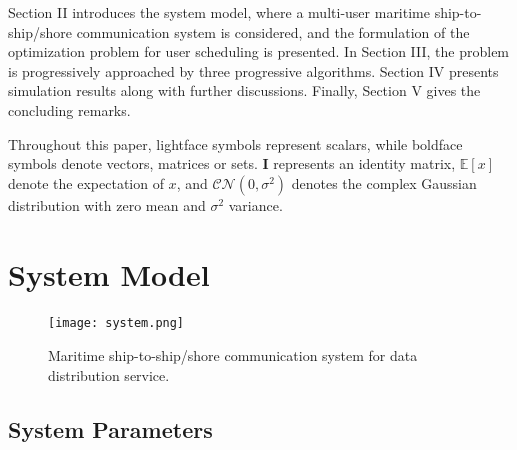 \documentclass[conference]{IEEEtran}
\begin{document}
 Section II introduces the system model, where a multi-user maritime ship-to-ship/shore communication system is considered, and the formulation of the optimization problem for user scheduling is presented. 
 In Section III, the problem is progressively approached by three progressive algorithms. 
 Section IV presents simulation results along with further discussions. 
 Finally, Section V gives the concluding remarks. 
 
 Throughout this paper, lightface symbols represent scalars, while boldface symbols denote vectors, matrices or sets. ${\mathbf{I}}$ represents an identity matrix, $\mathbb{E}[x]$ denote the expectation of $x$, and $\mathcal{CN}(0, {\sigma}^2)$ denotes the complex Gaussian distribution with zero mean and ${\sigma}^2$ variance. %
 
 \section{System Model}\label{sec:2}
 
 \begin{figure} [htb]
 \begin{center}
 \texttt{[image: system.png]}
 \end{center}
 \vspace*{-4mm} 
 \caption{Maritime ship-to-ship/shore communication system for data distribution service.}\label{fig:1}
 \vspace*{-4mm} 
 \end{figure}
 
 
 \subsection{System Parameters}
 
\end{document}
